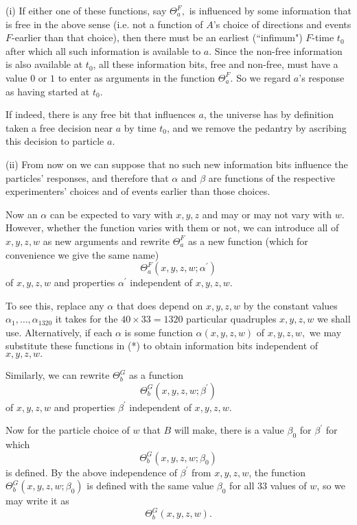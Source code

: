 \documentclass{article}
\begin{document}
(i) If either one of these functions, say $\Theta_a^F,$ is influenced by some information that is free in the above sense (i.e. not a function of $A$'s choice of directions and events $F$-earlier than that choice), then there must be an earliest (``infimum") $F$-time $t_0$ after which all such information is available to $a$. Since the non-free information is also available at $t_0$, all these information bits, free and non-free, must have a value $0$ or $1$ to enter as arguments in the function $\Theta_a^F.$ So we regard $a$'s response as having started at $t_0$. 

If indeed, there is any free bit that influences $a$, the universe has by definition taken a free decision near $a$ by time $t_0$, and we remove the pedantry by ascribing this decision to particle $a$.

(ii) From now on we can suppose that no such new information bits influence the particles' responses, and therefore that $\alpha$ and $\beta$ are functions of the respective experimenters' choices and of events earlier than those choices. 

Now an $\alpha$ can be expected to vary with $x, y, z$ and may or may not vary with $w$. However, whether the function varies with them or not, we can introduce all of $x, y, z, w$ as new arguments and rewrite $\Theta_a^F$ as a new function (which for convenience we give the same name) 
\begin{equation}\tag{*}
\Theta_a^F(x, y, z, w; \alpha^\prime)
\end{equation}
of $x,y,z,w$ and properties $\alpha^\prime$ independent of $x,y,z,w.$

To see this, replace any $\alpha$ that does depend on $x,y,z,w$ by the constant values $\alpha_1, \ldots, \alpha_{1320}$ it takes for the $40\times 33 = 1320$ particular quadruples $x,y,z,w$ we shall use. Alternatively, if each $\alpha$ is some function $\alpha(x,y,z,w)$ of $x,y,z,w,$ we may substitute these functions in (*) to obtain information bits independent of $x,y,z,w.$

Similarly, we can rewrite $\Theta_b^G$ as a function \[\Theta_b^G(x,y,z,w; \beta^\prime)\] of $x,y,z,w$ and properties $\beta^\prime$ independent of $x,y,z,w$. 

Now for the particle choice of $w$ that $B$ will make, there is a value $\beta_0$ for $\beta^\prime$ for which \[\Theta_b^G(x,y,z,w; \beta_0)\] is defined. By the above independence of $\beta^\prime$ from $x,y,z,w$, the function $\Theta_b^G(x,y,z,w; \beta_0)$ is defined with the same value $\beta_0$ for all $33$ values of $w$, so we may write it as \[\Theta^G_b(x,y,z,w).\]
\end{document}
